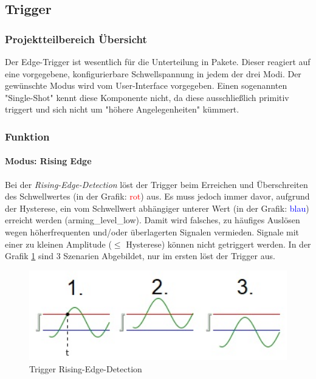 \subsection{Trigger}\label{trigger}
\subsubsection{Projektteilbereich Übersicht}
Der Edge-Trigger ist wesentlich für die Unterteilung in Pakete. Dieser reagiert auf eine vorgegebene, konfigurierbare Schwellspannung in jedem der drei Modi. Der gewünschte Modus wird vom User-Interface vorgegeben. Einen sogenannten "Single-Shot" kennt diese Komponente nicht, da diese ausschließlich primitiv triggert und sich nicht um "höhere Angelegenheiten" kümmert.
\subsubsection{Funktion}
\paragraph{Modus: Rising Edge}
Bei der \textit{Rising-Edge-Detection} löst der Trigger beim Erreichen und Überschreiten des Schwellwertes (in der Grafik: \textcolor{red}{rot}) aus. Es muss jedoch immer davor, aufgrund der Hysterese, ein vom Schwellwert abhängiger unterer Wert (in der Grafik: \textcolor{blue}{blau}) erreicht werden (arming\_level\_low). Damit wird falsches, zu häufiges Auslösen wegen höherfrequenten und/oder überlagerten Signalen vermieden. Signale mit einer zu kleinen Amplitude ($\leq$ Hysterese) können nicht getriggert werden. In der Grafik \ref{risingEdge} sind 3 Szenarien Abgebildet, nur im ersten löst der Trigger aus.
\begin{figure}[h]
	\begin{center}
		\includegraphics[width=15cm]{SAUER/Grafiken/Trigger/TriggerEdgeRising.jpg}
		\caption{Trigger Rising-Edge-Detection}
		\label{risingEdge}
	\end{center}
\end{figure}
